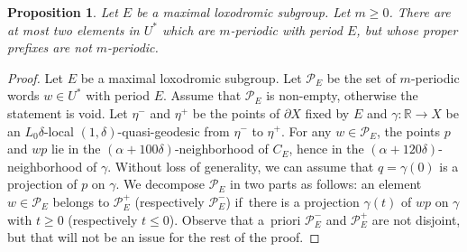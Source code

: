 \documentclass[JEP,XML,SOM,Unicode, NoEqCountersInSection,published]{cedram}
\let\mathcal\mathscr
\theoremstyle{plain}
\newtheorem{prop}[thm]{Proposition}
\theoremstyle{definition}
\begin{document}
\begin{prop}
\label{L: construction semi-group power sensitive}
Let $E$ be a maximal loxodromic subgroup.
Let $m \geq 0$.
There are at most two elements in $U^*$ which are $m$-periodic with period $E$, but whose proper prefixes are not $m$-periodic.
\end{prop}

\begin{proof} Let $E$ be a maximal loxodromic subgroup.
Let $\mathcal P_E$ be the set of $m$-periodic words $w \in U^*$ with period $E$.
Assume that $\mathcal P_E$ is non-empty, otherwise the statement is void.
Let $\eta^-$ and $\eta^+$ be the points of $\partial X$ fixed by $E$ and $\gamma \colon \mathbb R \to X$ be an $L_0\delta$-local $(1, \delta)$-quasi-geodesic from $\eta^-$ to $\eta^+$.
For any $w \in \mathcal P_E$, the points $p$ and $wp$ lie in the $(\alpha + 100\delta)$-neighborhood of $C_E$, hence in the $(\alpha + 120\delta)$-neighborhood of $\gamma$.
Without loss of generality, we can assume that $q = \gamma(0)$ is a projection of $p$ on $\gamma$.
We decompose $\mathcal P_E$ in two parts as follows: an element $w \in \mathcal P_E$ belongs to $\mathcal P_E^+$ (respectively $\mathcal P_E^-$) if~there is a projection $\gamma(t)$ of $wp$ on $\gamma$ with $t \geq 0$ (respectively $t \leq 0$).
Observe that a~priori $\mathcal P_E^-$ and $\mathcal P_E^+$ are not disjoint, but that will not be an issue for the rest of the proof.


\end{proof}
\end{document}
